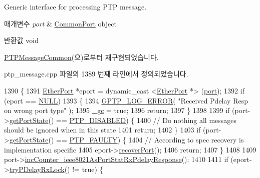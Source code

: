 Generic interface for processing P\+TP message. 


\begin{DoxyParams}{매개변수}
{\em port} & \hyperlink{class_common_port}{Common\+Port} object \\
\hline
\end{DoxyParams}
\begin{DoxyReturn}{반환값}
void 
\end{DoxyReturn}


\hyperlink{class_p_t_p_message_common_a45670a42f5684252d52543f9ed3a1551}{P\+T\+P\+Message\+Common}(으)로부터 재구현되었습니다.



ptp\+\_\+message.\+cpp 파일의 1389 번째 라인에서 정의되었습니다.


\begin{DoxyCode}
1390 \{
1391     \hyperlink{class_ether_port}{EtherPort} *eport = dynamic\_cast <\hyperlink{class_ether_port}{EtherPort} *> (\hyperlink{gst__avb__playbin_8c_a63c89c04d1feae07ca35558055155ffb}{port});
1392     \textcolor{keywordflow}{if} (eport == \hyperlink{openavb__types__base__pub_8h_a070d2ce7b6bb7e5c05602aa8c308d0c4}{NULL})
1393     \{
1394         \hyperlink{gptp__log_8hpp_afefbb1009717c128012bfeed94842987}{GPTP\_LOG\_ERROR}( \textcolor{stringliteral}{"Received Pdelay Resp on wrong port type"} );
1395         \hyperlink{class_p_t_p_message_common_a1b15d1687680708819ead19f82a970a9}{\_gc} = \textcolor{keyword}{true};
1396         \textcolor{keywordflow}{return};
1397     \}
1398 
1399     \textcolor{keywordflow}{if} (port->\hyperlink{class_common_port_aa4182d914fdb9a27fb875d8495e0289c}{getPortState}() == \hyperlink{ptptypes_8hpp_a679431f1afc75d7bb9e972c022e53672a38f3a091adeb361140c66f2f6dc44df7}{PTP\_DISABLED}) \{
1400         \textcolor{comment}{// Do nothing all messages should be ignored when in this state}
1401         \textcolor{keywordflow}{return};
1402     \}
1403     \textcolor{keywordflow}{if} (port->\hyperlink{class_common_port_aa4182d914fdb9a27fb875d8495e0289c}{getPortState}() == \hyperlink{ptptypes_8hpp_a679431f1afc75d7bb9e972c022e53672ac2e47460540ecdcec420be97a0bb9ff2}{PTP\_FAULTY}) \{
1404         \textcolor{comment}{// According to spec recovery is implementation specific}
1405         eport->\hyperlink{class_ether_port_adbdec0aadf109d5cff2279304ad73cd1}{recoverPort}();
1406         \textcolor{keywordflow}{return};
1407     \}
1408 
1409     port->\hyperlink{class_common_port_a6942efdfd632f8da83e8e5089f4a3ba1}{incCounter\_ieee8021AsPortStatRxPdelayResponse}();
1410 
1411     \textcolor{keywordflow}{if} (eport->\hyperlink{class_ether_port_a138c4cc138f701511969440550ddf6fb}{tryPDelayRxLock}() != \textcolor{keyword}{true}) \{

\end{DoxyCode}

